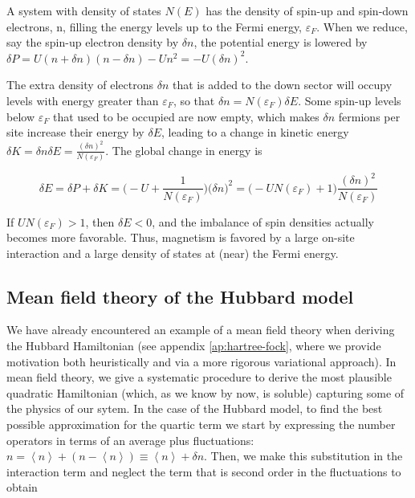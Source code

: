 A system with density of states $N(E)$ has the density of spin-up and spin-down electrons, n, filling the energy levels up to the Fermi energy, $\varepsilon_F$.
When we reduce, say the spin-up electron density by $\delta n$, the potential energy is lowered by $\delta P = U ( n + \delta n ) ( n - \delta n ) - U n^2 = - U (\delta n)^2$.

The extra density of electrons $\delta n$ that is added to the down sector will occupy levels with energy greater than $\varepsilon_F$, so that $\delta n = N ( \varepsilon_F ) \delta E$.
Some spin-up levels below $\varepsilon_F$ that used to be occupied are now empty, which makes $\delta n$ fermions per site increase their energy by $\delta E$, leading to a change in kinetic energy $\delta K = \delta n \delta E = \frac{(\delta n)^2}{N(\varepsilon_F)}$.
The global change in energy is

\begin{equation}
\delta E = \delta P + \delta K = \bigg( - U + \frac{1}{N(\varepsilon_F)} \bigg) \big( \delta n \big)^2 = \bigg( - U N ( \varepsilon_F ) + 1 \bigg) \frac{(\delta n)^2}{N(\varepsilon_F)}
\end{equation}

If $U N ( \varepsilon_F ) > 1$, then $\delta E < 0$, and the imbalance of spin densities actually becomes more favorable.
Thus, magnetism is favored by a large on-site interaction and a large density of states at (near) the Fermi energy.

\subsection{Mean field theory of the Hubbard model}

We have already encountered an example of a mean field theory when deriving the Hubbard Hamiltonian (see appendix \ref{ap:hartree-fock}, where we provide motivation both heuristically and via a more rigorous variational approach).
In mean field theory, we give a systematic procedure to derive the most plausible quadratic Hamiltonian (which, as we know by now, is soluble) capturing some of the physics of our sytem.
In the case of the Hubbard model, to find the best possible approximation for the quartic term we start by expressing the number operators in terms of an average plus fluctuations: $n = \left\langle n \right\rangle + ( n - \left\langle n \right\rangle ) \equiv \left\langle n \right\rangle + \delta n$.
Then, we make this substitution in the interaction term and neglect the term that is second order in the fluctuations to obtain

